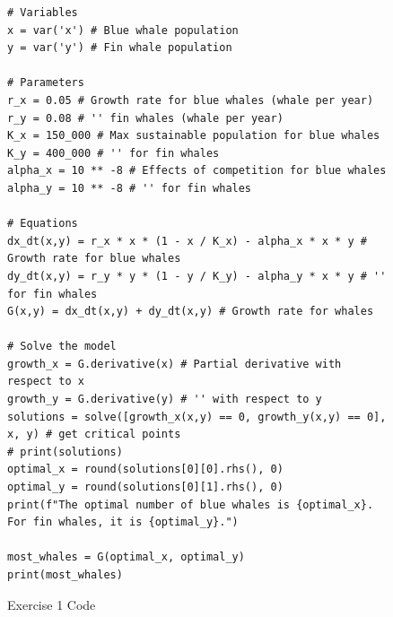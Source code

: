 \documentclass[12pt, oneside]{book}
\newenvironment{solution}{\textit{Solution.}}
\newcommand{\sol}[1]{
    \begin{customframedproof}[linecolor=orangehdx!75,]
        \begin{solution}
        #1
        \end{solution}
    \end{customframedproof}
}
\begin{document}
\begin{enumerate}
\begin{enumerate}
    \end{enumerate}
\end{enumerate}

\begin{figure}
    \label{ex:1}
    \begin{verbatim}
# Variables
x = var('x') # Blue whale population
y = var('y') # Fin whale population

# Parameters
r_x = 0.05 # Growth rate for blue whales (whale per year)
r_y = 0.08 # '' fin whales (whale per year)
K_x = 150_000 # Max sustainable population for blue whales 
K_y = 400_000 # '' for fin whales 
alpha_x = 10 ** -8 # Effects of competition for blue whales
alpha_y = 10 ** -8 # '' for fin whales

# Equations
dx_dt(x,y) = r_x * x * (1 - x / K_x) - alpha_x * x * y # Growth rate for blue whales
dy_dt(x,y) = r_y * y * (1 - y / K_y) - alpha_y * x * y # '' for fin whales
G(x,y) = dx_dt(x,y) + dy_dt(x,y) # Growth rate for whales

# Solve the model
growth_x = G.derivative(x) # Partial derivative with respect to x
growth_y = G.derivative(y) # '' with respect to y
solutions = solve([growth_x(x,y) == 0, growth_y(x,y) == 0], x, y) # get critical points
# print(solutions)
optimal_x = round(solutions[0][0].rhs(), 0)
optimal_y = round(solutions[0][1].rhs(), 0)
print(f"The optimal number of blue whales is {optimal_x}. For fin whales, it is {optimal_y}.")

most_whales = G(optimal_x, optimal_y)
print(most_whales)
    \end{verbatim}

    \caption{Exercise 1 Code}
    
\end{figure}
\end{document}

